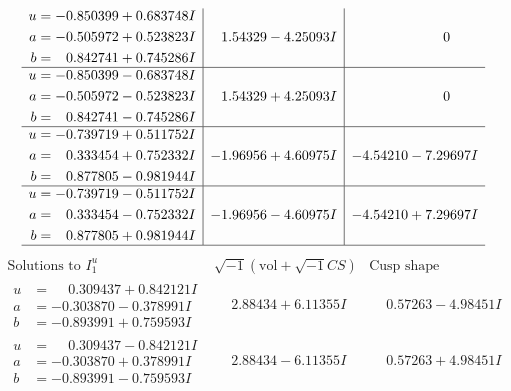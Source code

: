 \documentclass[1p]{elsarticle_modified}
\theoremstyle{definition}
\newcommand{\I}{\sqrt{-1}}
\begin{document}
$$\begin{array}{c|c|c}
\begin{aligned}
u &= -0.850399 + 0.683748 I \\
a &= -0.505972 + 0.523823 I \\
b &= \phantom{-}0.842741 + 0.745286 I\end{aligned}
 & \phantom{-}1.54329 - 4.25093 I & \phantom{-0.000000 } 0 \\ \hline\begin{aligned}
u &= -0.850399 - 0.683748 I \\
a &= -0.505972 - 0.523823 I \\
b &= \phantom{-}0.842741 - 0.745286 I\end{aligned}
 & \phantom{-}1.54329 + 4.25093 I & \phantom{-0.000000 } 0 \\ \hline\begin{aligned}
u &= -0.739719 + 0.511752 I \\
a &= \phantom{-}0.333454 + 0.752332 I \\
b &= \phantom{-}0.877805 - 0.981944 I\end{aligned}
 & -1.96956 + 4.60975 I & -4.54210 - 7.29697 I \\ \hline\begin{aligned}
u &= -0.739719 - 0.511752 I \\
a &= \phantom{-}0.333454 - 0.752332 I \\
b &= \phantom{-}0.877805 + 0.981944 I\end{aligned}
 & -1.96956 - 4.60975 I & -4.54210 + 7.29697 I\\
 \hline 
 \end{array}$$\newpage$$\begin{array}{c|c|c}  
\text{Solutions to }I^u_{1}& \I (\text{vol} + \sqrt{-1}CS) & \text{Cusp shape}\\
 \hline 
\begin{aligned}
u &= \phantom{-}0.309437 + 0.842121 I \\
a &= -0.303870 - 0.378991 I \\
b &= -0.893991 + 0.759593 I\end{aligned}
 & \phantom{-}2.88434 + 6.11355 I & \phantom{-}0.57263 - 4.98451 I \\ \hline\begin{aligned}
u &= \phantom{-}0.309437 - 0.842121 I \\
a &= -0.303870 + 0.378991 I \\
b &= -0.893991 - 0.759593 I\end{aligned}
 & \phantom{-}2.88434 - 6.11355 I & \phantom{-}0.57263 + 4.98451 I \\ \hline\begin{aligned}

\end{aligned}
\end{array}$$
\end{document}
